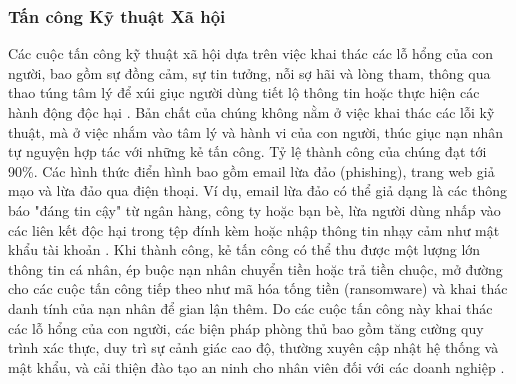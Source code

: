 \documentclass[conference]{IEEEtran}
\begin{document}
\subsubsection{Tấn công Kỹ thuật Xã hội}
Các cuộc tấn công kỹ thuật xã hội dựa trên việc khai thác các lỗ hổng của con người, bao gồm sự đồng cảm, sự tin tưởng, nỗi sợ hãi và lòng tham, thông qua thao túng tâm lý để xúi giục người dùng tiết lộ thông tin hoặc thực hiện các hành động độc hại \cite{ref15}. Bản chất của chúng không nằm ở việc khai thác các lỗi kỹ thuật, mà ở việc nhắm vào tâm lý và hành vi của con người, thúc giục nạn nhân tự nguyện hợp tác với những kẻ tấn công. Tỷ lệ thành công của chúng đạt tới 90\%. Các hình thức điển hình bao gồm email lừa đảo (phishing), trang web giả mạo và lừa đảo qua điện thoại. Ví dụ, email lừa đảo có thể giả dạng là các thông báo "đáng tin cậy" từ ngân hàng, công ty hoặc bạn bè, lừa người dùng nhấp vào các liên kết độc hại trong tệp đính kèm hoặc nhập thông tin nhạy cảm như mật khẩu tài khoản \cite{ref7}. Khi thành công, kẻ tấn công có thể thu được một lượng lớn thông tin cá nhân, ép buộc nạn nhân chuyển tiền hoặc trả tiền chuộc, mở đường cho các cuộc tấn công tiếp theo như mã hóa tống tiền (ransomware) và khai thác danh tính của nạn nhân để gian lận thêm. Do các cuộc tấn công này khai thác các lỗ hổng của con người, các biện pháp phòng thủ bao gồm tăng cường quy trình xác thực, duy trì sự cảnh giác cao độ, thường xuyên cập nhật hệ thống và mật khẩu, và cải thiện đào tạo an ninh cho nhân viên đối với các doanh nghiệp \cite{ref11}.
\end{document}
